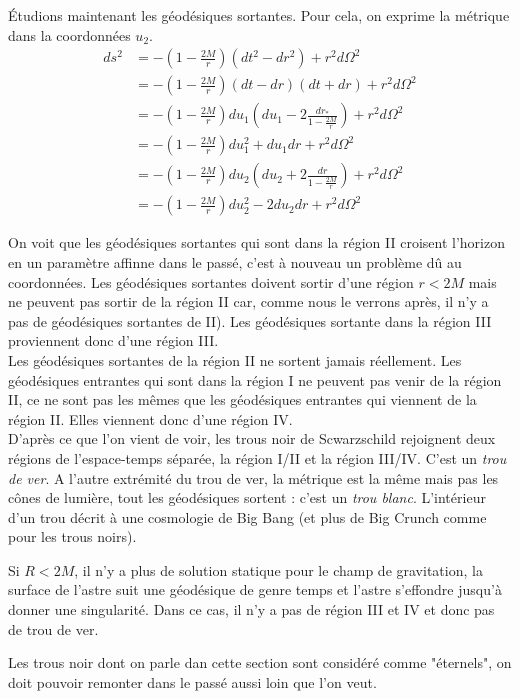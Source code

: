 \documentclass[a4paper,11pt]{report}
\begin{document}
            Étudions maintenant les géodésiques sortantes. Pour cela, on exprime la métrique dans la coordonnées $u_2$.
            \begin{align}
                ds^2 &= -\left( 1-\frac{2M}{r} \right)(dt^2-dr^2)+r^2 d\Omega^2\\
                &= -\left( 1-\frac{2M}{r} \right)(dt-dr)(dt+dr)+r^2 d\Omega^2\\
                &= -\left( 1-\frac{2M}{r} \right)du_1\left( du_1-2\frac{dr_*}{1-\frac{2M}{r}} \right)+r^2 d\Omega^2\\
                &= -\left( 1-\frac{2M}{r} \right)du^2_1+du_1dr+r^2 d\Omega^2\\
                &= -\left( 1-\frac{2M}{r} \right)du_2\left( du_2+2\frac{dr}{1-\frac{2M}{r}} \right)+r^2 d\Omega^2\\
                &= -\left( 1-\frac{2M}{r} \right)du^2_2-2du_2dr+r^2 d\Omega^2
            \end{align}
            
            On voit que les géodésiques sortantes qui sont dans la région II croisent l'horizon en un paramètre affinne dans le passé, c'est à nouveau un problème dû au coordonnées. Les géodésiques sortantes doivent sortir d'une région $r<2M$ mais ne peuvent pas sortir de la région II car, comme nous le verrons après, il n'y a pas de géodésiques sortantes de II). Les géodésiques sortante dans la région III proviennent donc d'une région III.\\
            
            Les géodésiques sortantes de la région II ne sortent jamais réellement. 
            Les géodésiques entrantes qui sont dans la région I ne peuvent pas venir de la région II, ce ne sont pas les mêmes que les géodésiques entrantes qui viennent de la région II. Elles viennent donc d'une région IV.\\
            
            
            D'après ce que l'on vient de voir, les trous noir de Scwarzschild rejoignent deux régions de l'espace-temps séparée, la région I/II et la région III/IV. C'est un \textit{trou de ver}. A l'autre extrémité du trou de ver, la métrique est la même mais pas les cônes de lumière, tout les géodésiques sortent : c'est un \textit{trou blanc}. L'intérieur d'un trou décrit à une cosmologie de Big Bang (et plus de Big Crunch comme pour les trous noirs). 
            
            \begin{rmk}
                Si $R<2M$, il n'y a plus de solution statique pour le champ de gravitation, la surface de l'astre suit une géodésique de genre temps et l'astre s'effondre jusqu'à donner une singularité. Dans ce cas, il n'y a pas de région III et IV et donc pas de trou de ver.
                
                
                Les trous noir dont on parle dan cette section sont considéré comme "éternels", on doit pouvoir remonter dans le passé aussi loin que l'on veut.
            \end{rmk}
            
\end{document}
